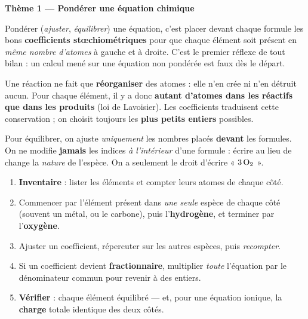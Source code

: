 \documentclass[11pt,a4paper]{article}
\begin{document}

\begin{center}
{\Large\bfseries\color{primarydark} Thème 1 — Pondérer une équation chimique}
\end{center}

\medskip
Pondérer (\emph{ajuster}, \emph{équilibrer}) une équation, c'est placer devant chaque formule les
bons \textbf{coefficients stœchiométriques} pour que chaque élément soit présent en \emph{même
nombre d'atomes} à gauche et à droite. C'est le premier réflexe de tout bilan : un calcul mené sur
une équation non pondérée est faux dès le départ.

\begin{cle}
Une réaction ne fait que \textbf{réorganiser} des atomes : elle n'en crée ni n'en détruit aucun.
Pour chaque élément, il y a donc \textbf{autant d'atomes dans les réactifs que dans les produits}
(loi de Lavoisier). Les coefficients traduisent cette conservation ; on choisit toujours les
\textbf{plus petits entiers} possibles.
\end{cle}

\begin{piege}
Pour équilibrer, on ajuste \emph{uniquement} les nombres placés \textbf{devant} les formules. On ne
modifie \textbf{jamais} les indices \emph{à l'intérieur} d'une formule : écrire  au lieu de
 change la \emph{nature} de l'espèce. On a seulement le droit d'écrire « $3\,\ce{O2}$ ».
\end{piege}

\begin{methode}
\begin{enumerate}[leftmargin=1.7em,topsep=2pt,itemsep=1.5pt]
  \item \textbf{Inventaire} : lister les éléments et compter leurs atomes de chaque côté.
  \item Commencer par l'élément présent dans \emph{une seule} espèce de chaque côté (souvent un
        métal, ou le carbone), puis l'\textbf{hydrogène}, et terminer par l'\textbf{oxygène}.
  \item Ajuster un coefficient, répercuter sur les autres espèces, puis \emph{recompter}.
  \item Si un coefficient devient \textbf{fractionnaire}, multiplier \emph{toute} l'équation par le
        dénominateur commun pour revenir à des entiers.
  \item \textbf{Vérifier} : chaque élément équilibré — et, pour une équation ionique, la
        \textbf{charge} totale identique des deux côtés.
\end{enumerate}
\end{methode}
\end{document}
